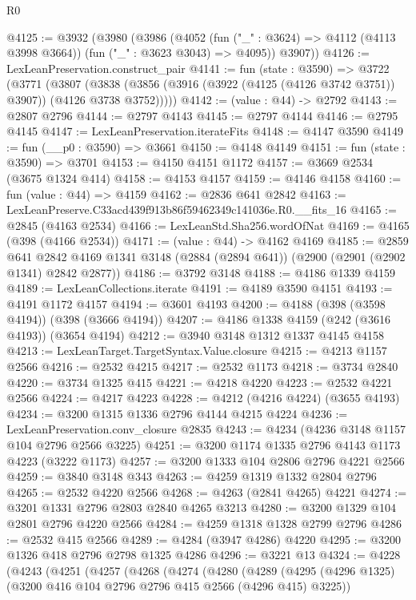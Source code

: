 \begin{lexlean}{R0}
\begin{coremodule}
@4125 := @3932
    (@3980
      (@3986
        (@4052 (fun ("_" : @3624) => @4112 (@4113 @3998 @3664)) (fun ("_" : @3623 @3043) => @4095))
        @3907))
@4126 := LexLeanPreservation.construct_pair
@4141 := fun (state : @3590) =>
  @3722
    (@3771
      (@3807 (@3838 (@3856 (@3916 (@3922 (@4125 (@4126 @3742 @3751)) @3907)) (@4126 @3738 @3752)))))
@4142 := (value : @44) -> @2792
@4143 := @2807 @2796
@4144 := @2797 @4143
@4145 := @2797 @4144
@4146 := @2795 @4145
@4147 := LexLeanPreservation.iterateFits
@4148 := @4147 @3590
@4149 := fun (__p0 : @3590) => @3661
@4150 := @4148 @4149
@4151 := fun (state : @3590) => @3701
@4153 := @4150 @4151 @1172
@4157 := @3669 @2534 (@3675 @1324 @414)
@4158 := @4153 @4157
@4159 := @4146 @4158
@4160 := fun (value : @44) => @4159
@4162 := @2836 @641 @2842
@4163 := LexLeanPreserve.C33acd439f913b86f59462349c141036e.R0.__fits_16
@4165 := @2845 (@4163 @2534)
@4166 := LexLeanStd.Sha256.wordOfNat
@4169 := @4165 (@398 (@4166 @2534))
@4171 := (value : @44) -> @4162 @4169
@4185 := @2859
    @641
    @2842
    @4169
    @1341
    @3148
    (@2884 (@2894 @641))
    (@2900 (@2901 (@2902 @1341) @2842 @2877))
@4186 := @3792 @3148
@4188 := @4186 @1339 @4159
@4189 := LexLeanCollections.iterate
@4191 := @4189 @3590 @4151
@4193 := @4191 @1172 @4157
@4194 := @3601 @4193
@4200 := @4188 (@398 (@3598 @4194)) (@398 (@3666 @4194))
@4207 := @4186 @1338 @4159 (@242 (@3616 @4193)) (@3654 @4194)
@4212 := @3940 @3148 @1312 @1337 @4145 @4158
@4213 := LexLeanTarget.TargetSyntax.Value.closure
@4215 := @4213 @1157 @2566
@4216 := @2532 @4215
@4217 := @2532 @1173
@4218 := @3734 @2840
@4220 := @3734 @1325 @415
@4221 := @4218 @4220
@4223 := @2532 @4221 @2566
@4224 := @4217 @4223
@4228 := @4212 (@4216 @4224) (@3655 @4193)
@4234 := @3200 @1315 @1336 @2796 @4144 @4215 @4224
@4236 := LexLeanPreservation.conv_closure @2835
@4243 := @4234 (@4236 @3148 @1157 @104 @2796 @2566 @3225)
@4251 := @3200 @1174 @1335 @2796 @4143 @1173 @4223 (@3222 @1173)
@4257 := @3200 @1333 @104 @2806 @2796 @4221 @2566
@4259 := @3840 @3148 @343
@4263 := @4259 @1319 @1332 @2804 @2796
@4265 := @2532 @4220 @2566
@4268 := @4263 (@2841 @4265) @4221
@4274 := @3201 @1331 @2796 @2803 @2840 @4265 @3213
@4280 := @3200 @1329 @104 @2801 @2796 @4220 @2566
@4284 := @4259 @1318 @1328 @2799 @2796
@4286 := @2532 @415 @2566
@4289 := @4284 (@3947 @4286) @4220
@4295 := @3200 @1326 @418 @2796 @2798 @1325 @4286
@4296 := @3221 @13
@4324 := @4228
    (@4243
      (@4251
        (@4257
          (@4268
            (@4274
              (@4280
                (@4289
                  (@4295 (@4296 @1325) (@3200 @416 @104 @2796 @2796 @415 @2566 (@4296 @415) @3225))

\end{coremodule}
\end{lexlean}

